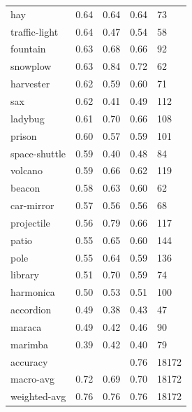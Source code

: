 \begin{center}
\begin{longtable}{lllll}
hay & 0.64 & 0.64 & 0.64 & 73 \\
traffic-light & 0.64 & 0.47 & 0.54 & 58 \\
fountain & 0.63 & 0.68 & 0.66 & 92 \\
snowplow & 0.63 & 0.84 & 0.72 & 62 \\
harvester & 0.62 & 0.59 & 0.60 & 71 \\
sax & 0.62 & 0.41 & 0.49 & 112 \\
ladybug & 0.61 & 0.70 & 0.66 & 108 \\
prison & 0.60 & 0.57 & 0.59 & 101 \\
space-shuttle & 0.59 & 0.40 & 0.48 & 84 \\
volcano & 0.59 & 0.66 & 0.62 & 119 \\
beacon & 0.58 & 0.63 & 0.60 & 62 \\
car-mirror & 0.57 & 0.56 & 0.56 & 68 \\
projectile & 0.56 & 0.79 & 0.66 & 117 \\
patio & 0.55 & 0.65 & 0.60 & 144 \\
pole & 0.55 & 0.64 & 0.59 & 136 \\
library & 0.51 & 0.70 & 0.59 & 74 \\
harmonica & 0.50 & 0.53 & 0.51 & 100 \\
accordion & 0.49 & 0.38 & 0.43 & 47 \\
maraca & 0.49 & 0.42 & 0.46 & 90 \\
marimba & 0.39 & 0.42 & 0.40 & 79 \\
\midrule
accuracy &  &  & 0.76 & 18172 \\
macro-avg & 0.72 & 0.69 & 0.70 & 18172 \\
weighted-avg & 0.76 & 0.76 & 0.76 & 18172 \\
\bottomrule
\end{longtable}
\end{center}
